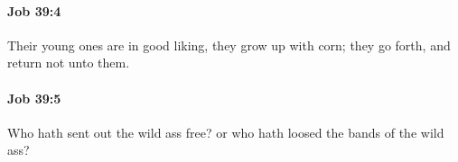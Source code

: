 		\paragraph{Job 39:4} %
			\label{JOB-39-4}

			Their young ones are in good liking, they grow up with corn; they go forth, and return not unto them.


		\paragraph{Job 39:5} %
			\label{JOB-39-5}

			Who hath sent out the wild ass free? or who hath loosed the bands of the wild ass?


